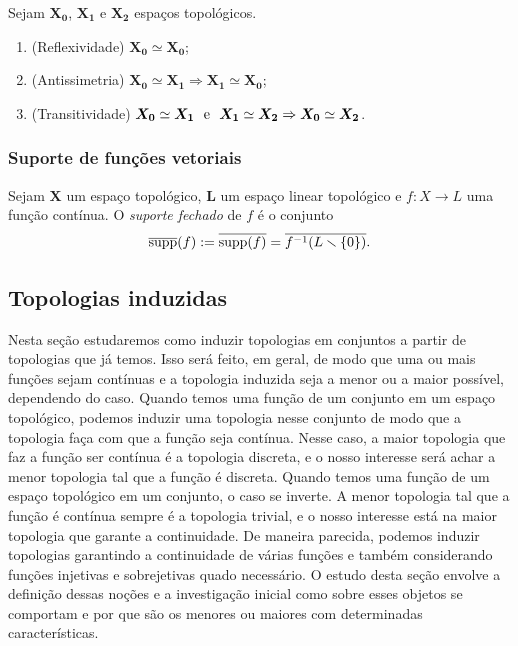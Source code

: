 \begin{exercise}
Sejam $\bm{X_0}$, $\bm{X_1}$ e $\bm{X_2}$ espaços topológicos.
		\begin{enumerate}
		\item (Reflexividade) $\bm{X_0} \simeq \bm{X_0}$;
		\item (Antissimetria) $\bm{X_0} \simeq \bm{X_1} \Rightarrow \bm{X_1} \simeq \bm{X_0}$;
		\item (Transitividade) $\bm{X_0} \simeq \bm{X_1} \text{\ \ e\ \ } \bm{X_1} \simeq \bm{X_2} \Rightarrow \bm{X_0} \simeq \bm{X_2}$.
		\end{enumerate}
\end{exercise}

\subsubsection{Suporte de funções vetoriais}

\begin{definition}
Sejam $\bm X$ um espaço topológico, $\bm L$ um espaço linear topológico e $f\colon X \to L$ uma função contínua. O \emph{suporte fechado} de $f$ é o conjunto
	\begin{equation*}
	\overline{\operatorname{supp}}(f) := \overline{\operatorname{supp}(f)} = \overline{f^{-1}(L \smallsetminus \{0\})}.
	\end{equation*}
\end{definition}

\subsection{Topologias induzidas}

Nesta seção estudaremos como induzir topologias em conjuntos a partir de topologias que já temos. Isso será feito, em geral, de modo que uma ou mais funções sejam contínuas e a topologia induzida seja a menor ou a maior possível, dependendo do caso. Quando temos uma função de um conjunto em um espaço topológico, podemos induzir uma topologia nesse conjunto de modo que a topologia faça com  que a função seja contínua. Nesse caso, a maior topologia que faz a função ser contínua é a topologia discreta, e o nosso interesse será achar a menor topologia tal que a função é discreta. Quando temos uma função de um espaço topológico em um conjunto, o caso se inverte. A menor topologia tal que a função é contínua sempre é a topologia trivial, e o nosso interesse está na maior topologia que garante a continuidade. De maneira parecida, podemos induzir topologias garantindo a continuidade de várias funções e também considerando funções injetivas e sobrejetivas quado necessário. O estudo desta seção envolve a definição dessas noções e a investigação inicial como sobre esses objetos se comportam e por que são os menores ou maiores com determinadas características.

